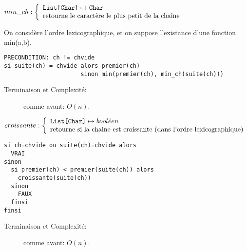 \documentclass[10pt]{article}\usepackage[nu]{esial}
\begin{document}
\begin{Question}
  $min\_ch: \left\{
    \begin{array}{l}
      \text{\texttt{List[Char]}}\mapsto \text{\texttt{Char}}\\
      \text{retourne le caractère le plus petit de la chaîne}
    \end{array}\right.$  
  
  \smallskip
  On considère l'ordre lexicographique, et on suppose l'existance d'une
  fonction min(a,b).
\end{Question}
\begin{Reponse}
  \begin{Verbatim}[label=min\_ch(ch)]
PRECONDITION: ch != chvide
si suite(ch) = chvide alors premier(ch)
                      sinon min(premier(ch), min_ch(suite(ch)))
  \end{Verbatim}

  \begin{description}
  \item[Terminaison et Complexité:] comme avant: $O(n)$. 
  \end{description}
\end{Reponse}

\begin{Question}
  $croissante: \left\{
    \begin{array}{l}
      \text{\texttt{List[Char]}}\mapsto bool\acute{e}en\\
      \text{retourne si la chaine est croissante (dans l'ordre lexicographique)}
    \end{array}\right.$  
\end{Question}
\begin{Reponse}
  \begin{Verbatim}[label=croissante(ch)]
si ch=chvide ou suite(ch)=chvide alors
  VRAI
sinon
  si premier(ch) < premier(suite(ch)) alors
    croissante(suite(ch))
  sinon
    FAUX
  finsi
finsi
  \end{Verbatim}
  \begin{description}
  \item[Terminaison et Complexité:] comme avant: $O(n)$. 
  \end{description}
\end{Reponse}
\end{document}
